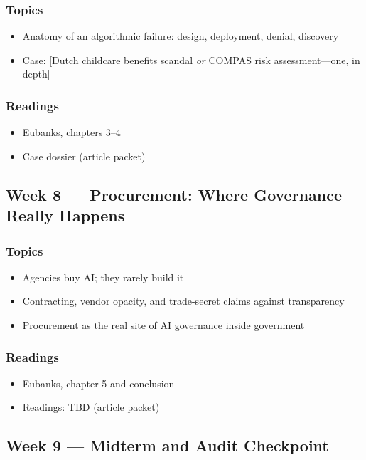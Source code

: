 \documentclass[12pt]{article}
\begin{document}
    \subsubsection*{Topics}
        \begin{itemize}
            \item Anatomy of an algorithmic failure: design, deployment, denial, discovery
            \item Case: [Dutch childcare benefits scandal \emph{or} COMPAS risk assessment---one, in depth]
        \end{itemize}
    \subsubsection*{Readings}
        \begin{itemize}
            \item Eubanks, chapters 3--4
            \item Case dossier (article packet)
        \end{itemize}

\subsection*{Week 8 --- Procurement: Where Governance Really Happens}
    \subsubsection*{Topics}
        \begin{itemize}
            \item Agencies buy AI; they rarely build it
            \item Contracting, vendor opacity, and trade-secret claims against transparency
            \item Procurement as the real site of AI governance inside government
        \end{itemize}
    \subsubsection*{Readings}
        \begin{itemize}
            \item Eubanks, chapter 5 and conclusion
            \item Readings: TBD (article packet)
        \end{itemize}

\subsection*{Week 9 --- Midterm and Audit Checkpoint}
\end{document}
